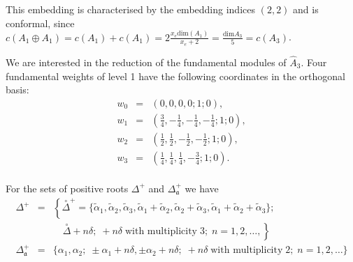 \documentclass[a4paper,12pt]{article}
\theoremstyle{definition} \newtheorem{Def}{Definition}
\newcommand{\co}[1]{\overset{\circ }{#1}}
\begin{document}
This embedding is characterised by the embedding indices $(2,2)$ and is conformal, since $c(A_1\oplus A_1)=c(A_1)+c(A_1)=2\frac{x_e \mathrm{dim}(A_1)}{x_e+2}=\frac{\mathrm{dim}A_3}{5}=c(A_3)$.

We are interested in the reduction of the fundamental modules of $\hat A_3$.
Four fundamental weights of level 1 have the following coordinates in the orthogonal basis: 
\begin{equation}
  \begin{array}{lll}
     w_0 & = & (0,0,0,0;1;0),\\
     w_1 & = & (\frac{3}{4},-\frac{1}{4},-\frac{1}{4},-\frac{1}{4}; 1; 0),\\
     w_2 & = & (\frac{1}{2},\frac{1}{2},-\frac{1}{2},-\frac{1}{2}; 1; 0),\\
     w_3 & = & (\frac{1}{4},\frac{1}{4},\frac{1}{4},-\frac{3}{4}; 1; 0). \\
  \end{array}
\end{equation}

For the sets of positive roots $\Delta^{+}$ and $\Delta_{\mathfrak{a}}^{+}$ we have
\begin{equation}
  \label{eq:38}
  \begin{array}{lll}
    \Delta^{+} &=&\left\{\co{\Delta}^{+}=\{\tilde{\alpha}_1, \tilde{\alpha}_2, \tilde{\alpha}_3, \tilde{\alpha}_1+\tilde{\alpha}_2, \tilde{\alpha}_2+\tilde{\alpha}_3, \tilde{\alpha}_1+\tilde{\alpha}_2+\tilde{\alpha}_3\};\right.\\
    &\; & \quad\left.\co{\Delta}+n\delta;\;     +n\delta\;\mbox{with multiplicity}\; 3;\; n=1,2,\dots,\right\}\\
    \Delta_{\mathfrak{a}}^{+} &=& \{  \alpha_1,\alpha_2;\;\pm \alpha_1+n\delta,\pm \alpha_2+n\delta;\; +n\delta\; \mbox{with multiplicity} \; 2;\; n=1,2,\dots\}\\
  \end{array}
\end{equation}
\end{document}
